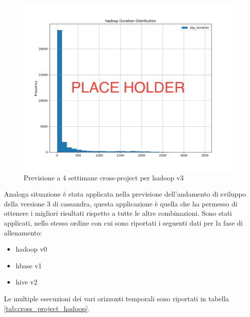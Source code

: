 \documentclass[%
    corpo=12pt,
    twoside,
    oldstyle,
    autoretitolo,
    greek,
    evenboxes,
]{toptesi}
\begin{document}
\begin{figure}[!ht]
  \includegraphics[width=\linewidth]{figure/place_holder.png}
  \caption{Previsione a 4 settimane cross-project per hadoop v3}
  \label{fig:hadoop_cp_nn_4w}
\end{figure}
Analoga situazione è stata applicata nella previsione dell'andamento di sviluppo della versione 3 di cassandra, questa applicazione è quella che ha permesso di ottenere i migliori risultati rispetto a tutte le altre combinazioni. Sono stati applicati, nello stesso ordine con cui sono riportati i seguenti dati per la fase di allenamento:
\begin{itemize}
  \item hadoop v0
  \item hbase v1
  \item hive v2
\end{itemize}
Le multiple esecuzioni dei vari orizzonti temporali sono riportati in tabella \ref{tab:cross_project_hadoop}.
\end{document}
